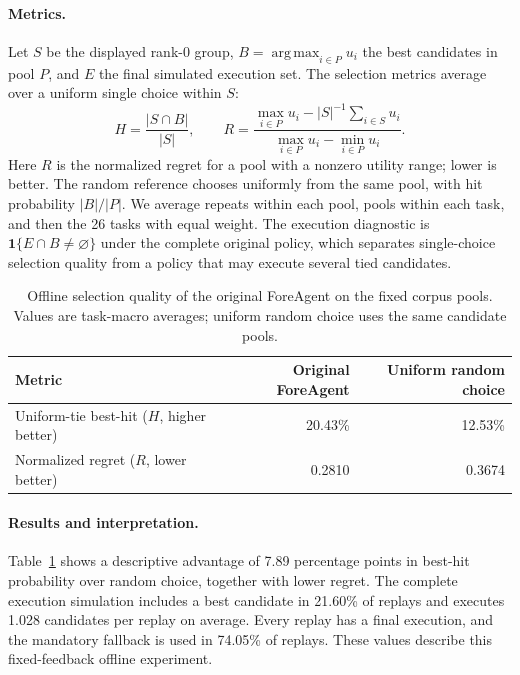 \paragraph{Metrics.}
Let $S$ be the displayed rank-0 group, $B=\operatorname*{arg\,max}_{i\in P}u_i$ the best candidates in pool $P$, and $E$ the final simulated execution set. The selection metrics average over a uniform single choice within $S$:
\begin{equation}
  H=\frac{|S\cap B|}{|S|},\qquad
  R=\frac{\max_{i\in P}u_i-|S|^{-1}\sum_{i\in S}u_i}
  {\max_{i\in P}u_i-\min_{i\in P}u_i}.
  \label{eq:offline-metrics}
\end{equation}
Here $R$ is the normalized regret for a pool with a nonzero utility range; lower is better. The random reference chooses uniformly from the same pool, with hit probability $|B|/|P|$. We average repeats within each pool, pools within each task, and then the 26 tasks with equal weight. The execution diagnostic is $\mathbf{1}\{E\cap B\ne\varnothing\}$ under the complete original policy, which separates single-choice selection quality from a policy that may execute several tied candidates.

\begin{table}[htbp]
  \centering
  \caption{Offline selection quality of the original ForeAgent on the fixed corpus pools. Values are task-macro averages; uniform random choice uses the same candidate pools.}
  \label{tab:offline-quality}
  \begin{tabular}{lrr}
    \toprule
    Metric & Original ForeAgent & Uniform random choice \\
    \midrule
    Uniform-tie best-hit ($H$, higher better) & 20.43\% & 12.53\% \\
    Normalized regret ($R$, lower better) & 0.2810 & 0.3674 \\
    \bottomrule
  \end{tabular}
\end{table}

\paragraph{Results and interpretation.}
Table~\ref{tab:offline-quality} shows a descriptive advantage of 7.89 percentage points in best-hit probability over random choice, together with lower regret. The complete execution simulation includes a best candidate in 21.60\% of replays and executes 1.028 candidates per replay on average. Every replay has a final execution, and the mandatory fallback is used in 74.05\% of replays. These values describe this fixed-feedback offline experiment.

